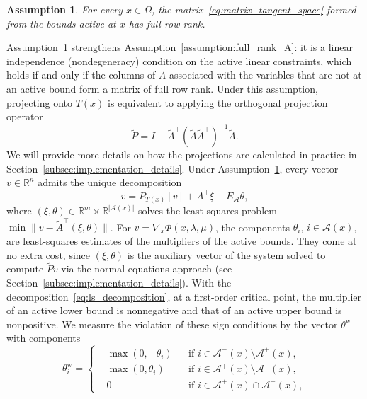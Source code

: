 \documentclass[pdflatex,sn-mathphys-num]{sn-jnl}%
\theoremstyle{thmstyleone}%
\newtheorem{assumption}{Assumption}
\newcommand{\RR}{{\mathbb{R}}} %
\newcommand{\calA}{{\mathcal{A}}}
\newcommand{\proj}[2]{P_{#1} \left[ {#2} \right]} %
\begin{document}
\begin{assumption}\label{assumption:full_rank_active}
	For every $x \in \Omega$, the matrix~\eqref{eq:matrix_tangent_space} formed from the bounds active at $x$ has full row rank.
\end{assumption}
Assumption~\ref{assumption:full_rank_active} strengthens Assumption~\ref{assumption:full_rank_A}: it is a linear independence (nondegeneracy) condition on the active linear constraints, which holds if and only if the columns of $A$ associated with the variables that are not at an active bound form a matrix of full row rank. Under this assumption, projecting onto $T(x)$ is equivalent to applying the orthogonal projection operator
\begin{equation}\label{eq:minor_subpb_projector}
	\tilde{P} = I - \tilde{A}^\top\left(\tilde{A}\tilde{A}^\top\right)^{-1}\tilde{A}.
\end{equation}
We will provide more details on how the projections are calculated in practice in Section~\ref{subsec:implementation_details}. Under Assumption~\ref{assumption:full_rank_active}, every vector $v \in \RR^n$ admits the unique decomposition
\begin{equation}\label{eq:ls_decomposition}
	v = \proj{T(x)}{v} + A^\top \xi + E_\calA \theta,
\end{equation}
where $(\xi,\theta) \in \RR^m \times \RR^{|\calA(x)|}$ solves the least-squares problem $\min \|v - \tilde{A}^\top (\xi,\theta)\|$. For $v = \nabla_x\Phi(x,\lambda,\mu)$, the components $\theta_i$, $i \in \calA(x)$, are least-squares estimates of the multipliers of the active bounds. They come at no extra cost, since $(\xi,\theta)$ is the auxiliary vector of the system solved to compute $\tilde{P}v$ via the normal equations approach (see Section~\ref{subsec:implementation_details}). With the decomposition~\eqref{eq:ls_decomposition}, at a first-order critical point, the multiplier of an active lower bound is nonnegative and that of an active upper bound is nonpositive. We measure the violation of these sign conditions by the vector $\theta^{\mathrm{w}}$ with components
\begin{equation*}
	\theta^{\mathrm{w}}_i = \left\{\begin{aligned}
		& \max(0,-\theta_i) & & \text{if } i \in \calA^-(x) \setminus \calA^+(x), \\
		& \max(0,\theta_i) & & \text{if } i \in \calA^+(x) \setminus \calA^-(x), \\
		& 0 & & \text{if } i \in \calA^+(x) \cap \calA^-(x),
	\end{aligned}\right.
\end{equation*}
\end{document}
